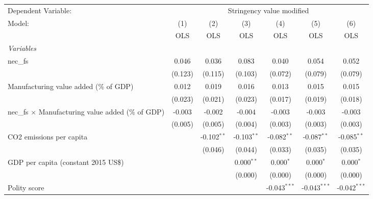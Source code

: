 
\begingroup
\centering
\begin{tabular}{lcccccc}
   \toprule
   Dependent Variable: & \multicolumn{6}{c}{Stringency value modified}\\
   Model:                                                    & (1)     & (2)           & (3)           & (4)            & (5)            & (6)\\  
                                                             &  OLS    & OLS           & OLS           & OLS            & OLS            & OLS\\  
   \midrule
   \emph{Variables}\\
   nec\_fs                                                   & 0.046   & 0.036         & 0.083         & 0.040          & 0.054          & 0.052\\   
                                                             & (0.123) & (0.115)       & (0.103)       & (0.072)        & (0.079)        & (0.079)\\   
   Manufacturing value added (\% of GDP)                     & 0.012   & 0.019         & 0.016         & 0.013          & 0.015          & 0.015\\   
                                                             & (0.023) & (0.021)       & (0.023)       & (0.017)        & (0.019)        & (0.018)\\   
   nec\_fs $\times$ Manufacturing value added (\% of GDP)    & -0.003  & -0.002        & -0.004        & -0.003         & -0.003         & -0.003\\   
                                                             & (0.005) & (0.005)       & (0.004)       & (0.003)        & (0.003)        & (0.003)\\   
   CO2 emissions per capita                                  &         & -0.102$^{**}$ & -0.103$^{**}$ & -0.082$^{**}$  & -0.087$^{**}$  & -0.085$^{**}$\\   
                                                             &         & (0.046)       & (0.044)       & (0.033)        & (0.035)        & (0.035)\\   
   GDP per capita (constant 2015 US\$)                       &         &               & 0.000$^{**}$  & 0.000$^{*}$    & 0.000$^{*}$    & 0.000$^{*}$\\   
                                                             &         &               & (0.000)       & (0.000)        & (0.000)        & (0.000)\\   
   Polity score                                              &         &               &               & -0.043$^{***}$ & -0.043$^{***}$ & -0.042$^{***}$\\   

\end{tabular}
